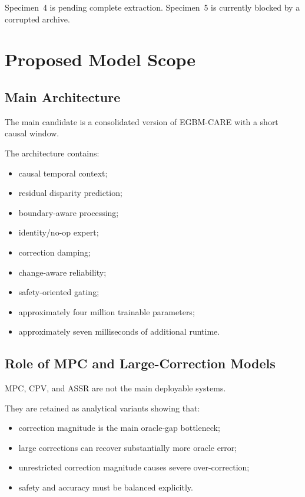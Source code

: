 \documentclass[11pt,a4paper]{article}
\newcommand{\method}{EGBM-CARE}
\begin{document}
Specimen~4 is pending complete extraction. Specimen~5 is currently blocked by a
corrupted archive.

\section{Proposed Model Scope}

\subsection{Main Architecture}

The main candidate is a consolidated version of \method{} with a short causal
window.

The architecture contains:

\begin{itemize}[leftmargin=*]
    \item causal temporal context;
    \item residual disparity prediction;
    \item boundary-aware processing;
    \item identity/no-op expert;
    \item correction damping;
    \item change-aware reliability;
    \item safety-oriented gating;
    \item approximately four million trainable parameters;
    \item approximately seven milliseconds of additional runtime.
\end{itemize}

\subsection{Role of MPC and Large-Correction Models}

MPC, CPV, and ASSR are not the main deployable systems.

They are retained as analytical variants showing that:

\begin{itemize}[leftmargin=*]
    \item correction magnitude is the main oracle-gap bottleneck;
    \item large corrections can recover substantially more oracle error;
    \item unrestricted correction magnitude causes severe over-correction;
    \item safety and accuracy must be balanced explicitly.
\end{itemize}
\end{document}
